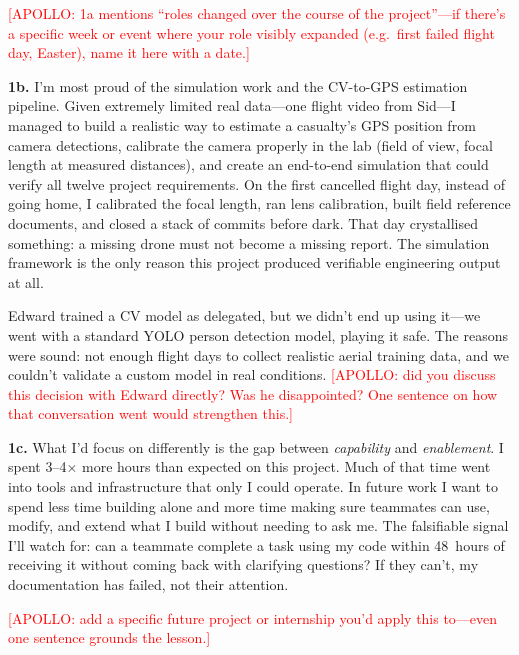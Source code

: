 \textcolor{red}{[APOLLO: 1a mentions ``roles changed over the course of the project''---if there's a specific week or event where your role visibly expanded (e.g.\ first failed flight day, Easter), name it here with a date.]}

\textbf{1b.}
I'm most proud of the simulation work and the CV-to-GPS estimation pipeline. Given extremely limited real data---one flight video from Sid---I managed to build a realistic way to estimate a casualty's GPS position from camera detections, calibrate the camera properly in the lab (field of view, focal length at measured distances), and create an end-to-end simulation that could verify all twelve project requirements. On the first cancelled flight day, instead of going home, I calibrated the focal length, ran lens calibration, built field reference documents, and closed a stack of commits before dark. That day crystallised something: a missing drone must not become a missing report. The simulation framework is the only reason this project produced verifiable engineering output at all.

Edward trained a CV model as delegated, but we didn't end up using it---we went with a standard YOLO person detection model, playing it safe. The reasons were sound: not enough flight days to collect realistic aerial training data, and we couldn't validate a custom model in real conditions. \textcolor{red}{[APOLLO: did you discuss this decision with Edward directly? Was he disappointed? One sentence on how that conversation went would strengthen this.]}

\textbf{1c.}
What I'd focus on differently is the gap between \emph{capability} and \emph{enablement}. I spent 3--4$\times$ more hours than expected on this project. Much of that time went into tools and infrastructure that only I could operate. In future work I want to spend less time building alone and more time making sure teammates can use, modify, and extend what I build without needing to ask me. The falsifiable signal I'll watch for: can a teammate complete a task using my code within 48~hours of receiving it without coming back with clarifying questions? If they can't, my documentation has failed, not their attention.

\textcolor{red}{[APOLLO: add a specific future project or internship you'd apply this to---even one sentence grounds the lesson.]}
